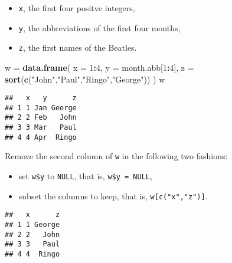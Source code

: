 \documentclass[]{article}
\newenvironment{Shaded}{\begin{snugshade}}{\end{snugshade}}
\newcommand{\KeywordTok}[1]{\textcolor[rgb]{0.13,0.29,0.53}{\textbf{#1}}}
\newcommand{\DataTypeTok}[1]{\textcolor[rgb]{0.13,0.29,0.53}{#1}}
\newcommand{\DecValTok}[1]{\textcolor[rgb]{0.00,0.00,0.81}{#1}}
\newcommand{\StringTok}[1]{\textcolor[rgb]{0.31,0.60,0.02}{#1}}
\newcommand{\OtherTok}[1]{\textcolor[rgb]{0.56,0.35,0.01}{#1}}
\newcommand{\OperatorTok}[1]{\textcolor[rgb]{0.81,0.36,0.00}{\textbf{#1}}}
\newcommand{\NormalTok}[1]{#1}
\providecommand{\tightlist}{%
  \setlength{\itemsep}{0pt}\setlength{\parskip}{0pt}}
\begin{document}
\begin{itemize}
\tightlist
\item
  \texttt{x}, the first four positve integers,
\item
  \texttt{y}, the abbreviations of the first four months,
\item
  \texttt{z}, the first names of the Beatles.
\end{itemize}

\begin{Shaded}
\begin{Highlighting}[]
\NormalTok{w =}\StringTok{ }\KeywordTok{data.frame}\NormalTok{( }\DataTypeTok{x =} \DecValTok{1}\OperatorTok{:}\DecValTok{4}\NormalTok{,}
                \DataTypeTok{y =}\NormalTok{ month.abb[}\DecValTok{1}\OperatorTok{:}\DecValTok{4}\NormalTok{],}
                \DataTypeTok{z =} \KeywordTok{sort}\NormalTok{(}\KeywordTok{c}\NormalTok{(}\StringTok{"John"}\NormalTok{,}\StringTok{"Paul"}\NormalTok{,}\StringTok{"Ringo"}\NormalTok{,}\StringTok{"George"}\NormalTok{))}
\NormalTok{)}
\NormalTok{w}
\end{Highlighting}
\end{Shaded}

\begin{verbatim}
##   x   y      z
## 1 1 Jan George
## 2 2 Feb   John
## 3 3 Mar   Paul
## 4 4 Apr  Ringo
\end{verbatim}

Remove the second column of \texttt{w} in the following two fashions:

\begin{itemize}
\tightlist
\item
  set \texttt{w\$y} to \texttt{NULL}, that is, \texttt{w\$y\ =\ NULL},
\item
  subset the columns to keep, that is, \texttt{w{[}c("x","z"){]}}.
\end{itemize}

\begin{Shaded}
\end{Shaded}

\begin{verbatim}
##   x      z
## 1 1 George
## 2 2   John
## 3 3   Paul
## 4 4  Ringo
\end{verbatim}
\end{document}
